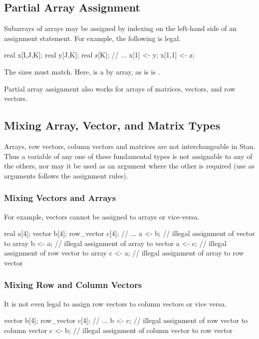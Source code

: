 \subsection{Partial Array Assignment}

Subarrays of arrays may be assigned by indexing on the left-hand side
of an assignment statement.  For example, the following is legal.
%
\begin{stancode}
real x[I,J,K];
real y[J,K];
real z[K];
// ...
x[1] <- y;
x[1,1] <- z;
\end{stancode}
%
The sizes must match.  Here,  is a  by 
array, as is is .

Partial array assignment also works for arrays of matrices, vectors,
and row vectors.


\subsection{Mixing Array, Vector, and Matrix Types}

Arrays, row vectors, column vectors and matrices are not
interchangeable in Stan.  Thus a variable of any one of these
fundamental types is not assignable to any of the others, nor may it
be used as an argument where the other is required (use as arguments
follows the assignment rules).



\subsubsection{Mixing Vectors and Arrays}

For example, vectors cannot be assigned to arrays or vice-versa.
%
\begin{stancode}
real a[4];
vector b[4];
row_vector c[4];
// ...
a <- b; // illegal assignment of vector to array
b <- a; // illegal assignment of array to vector
a <- c; // illegal assignment of row vector to array
c <- a; // illegal assignment of array to row vector
\end{stancode}

\subsubsection{Mixing Row and Column Vectors}

It is not even legal to assign row vectors to column vectors or vice
versa.
\begin{stancode}
vector b[4];
row_vector c[4];
// ...
b <- c; // illegal assignment of row vector to column vector
c <- b; // illegal assignment of column vector to row vector
\end{stancode}
%

